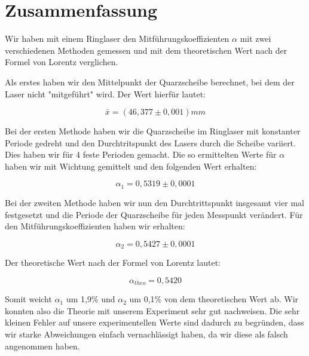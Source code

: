 \section{Zusammenfassung}

Wir haben mit einem Ringlaser den Mitführungskoeffizienten $\alpha$ mit zwei verschiedenen Methoden gemessen und mit dem theoretischen Wert nach der Formel von Lorentz verglichen.

Als erstes haben wir den Mittelpunkt der Quarzscheibe berechnet, bei dem der Laser nicht "mitgeführt" wird. Der Wert hierfür lautet:

$$\bar x = (46,377 \pm 0,001) mm$$

Bei der ersten Methode haben wir die Quarzscheibe im Ringlaser mit konstanter Periode gedreht und den Durchtritspunkt des Lasers durch die Scheibe variiert. Dies haben wir für 4 feste Perioden gemacht. Die so ermittelten Werte für $\alpha$ haben wir mit Wichtung gemittelt und den folgenden Wert erhalten:

$$\alpha_1 = 0,5319 \pm 0,0001$$

Bei der zweiten Methode haben wir nun den Durchtrittspunkt insgesamt vier mal festgesetzt und die Periode der Quarzscheibe für jeden Messpunkt verändert. Für den Mitführungskoeffizienten haben wir erhalten:

$$\alpha_2 = 0,5427 \pm 0,0001$$

Der theoretische Wert nach der Formel von Lorentz lautet:

$$\alpha_{theo} = 0,5420$$

Somit weicht $\alpha_1$ um 1,9\% und $\alpha_2$ um 0,1\% von dem theoretischen Wert ab. Wir konnten also die Theorie mit unserem Experiment sehr gut nachweisen. Die sehr kleinen Fehler auf unsere experimentellen Werte sind dadurch zu begründen, dass wir starke Abweichungen einfach vernachlässigt haben, da wir diese als falsch angenommen haben.

\clearpage